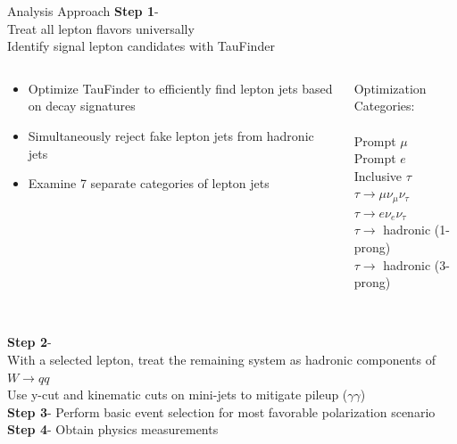 \documentclass[10pt]{beamer}
\begin{document}
\begin{frame}{Analysis Approach}
\textbf{Step 1}-\\
Treat all lepton flavors universally\\
Identify signal lepton candidates with TauFinder\\
\scriptsize
\begin{columns}
\begin{column}{0.5\textwidth}
\begin{itemize}
\item Optimize TauFinder to efficiently find lepton jets based on decay signatures
\item Simultaneously reject fake lepton jets from hadronic jets
\item Examine 7 separate categories of lepton jets
\end{itemize}
\end{column}
\begin{column}{0.5\textwidth}

		Optimization Categories:\\
		\quad \quad \\
		Prompt $\mu$\\
		Prompt $e$\\
		Inclusive $\tau$\\
		$\tau\rightarrow \mu \nu_{\mu} \nu_{\tau}$ \\
		$\tau\rightarrow e \nu_{e} \nu_{\tau}$\\
		$\tau \rightarrow$ hadronic (1-prong)\\
		$\tau \rightarrow$ hadronic (3-prong)\\

\end{column}
\end{columns}
\quad \quad \quad 
\\	%
	\normalsize
\textbf{Step 2}-\\
With a selected lepton, treat the remaining system as hadronic components of $W\rightarrow qq$\\
\quad \quad \scriptsize Use y-cut and kinematic cuts on mini-jets to mitigate pileup ($\gamma \gamma$)\\
\normalsize
\textbf{Step 3}- Perform basic event selection for most favorable polarization scenario\\
\textbf{Step 4}- Obtain physics measurements\\
\end{frame}
\end{document}
